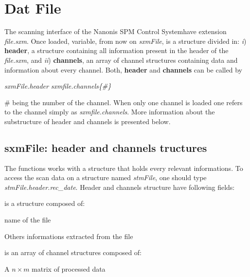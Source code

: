 \newpage

\section{Dat File}

The scanning interface of the Nanonis SPM Control System\texttrademark \;have extension \emph{file.sxm}. 
Once loaded, variable, from now on \emph{sxmFile}, is a structure divided in: \emph{i}) \textbf{header}, a structure containing all information present in the header of the \emph{file.sxm}, and \emph{ii}) \textbf{channels}, an array of channel structures containing data and information about every channel.
Both, \textbf{header} and \textbf{channels} can be called by
\begin{center}
\emph{sxmFile.header} \quad {} \quad \emph{sxmfile.channels\{\#\}}
\end{center}
\# being the number of the channel. When only one channel is loaded one refers to the channel simply as \emph{sxmfile.channels}. 
More information about the substructure of header and channels is presented below.


\subsection{sxmFile: header and channels tructures}
\label{sec:sxmFile}

The functions works with a structure that holds every relevant informations. To access the scan data on a structure named \emph{stmFile}, one should type \emph{stmFile.header.rec\_date}. Header and channels structure have following fields:

\bdf
\item[header] is a structure composed of:
  \bdf
  \item[scan\_file] name of the file
  \item[$\cdots$] Others informations extracted from the file
  \edf

\item[experiments] is an array of channel structures composed of:
  \bdf
  \item[data] A $n\times m$ matrix of processed data
  \edf
\edf


